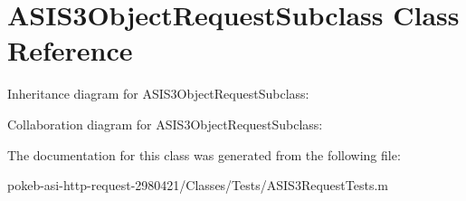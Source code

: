 \hypertarget{interface_a_s_i_s3_object_request_subclass}{
\section{\-A\-S\-I\-S3\-Object\-Request\-Subclass \-Class \-Reference}
\label{interface_a_s_i_s3_object_request_subclass}
}


\-Inheritance diagram for \-A\-S\-I\-S3\-Object\-Request\-Subclass\-:


\-Collaboration diagram for \-A\-S\-I\-S3\-Object\-Request\-Subclass\-:


\-The documentation for this class was generated from the following file\-:\begin{DoxyCompactItemize}
\item 
pokeb-\/asi-\/http-\/request-\/2980421/\-Classes/\-Tests/\-A\-S\-I\-S3\-Request\-Tests.\-m\end{DoxyCompactItemize}
